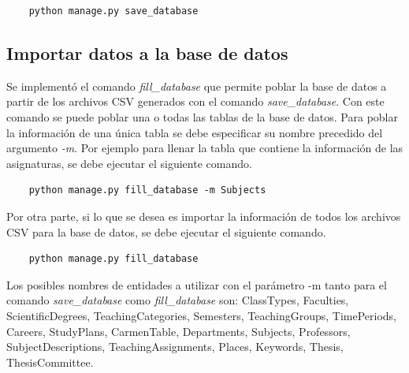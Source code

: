 \begin{verbatim}
    python manage.py save_database
\end{verbatim}


\subsection{Importar datos a la base de datos}
Se implementó el comando \textit{fill\_database} que permite poblar la 
base de datos a partir de los archivos CSV generados con el comando \textit{save\_database}.
Con este comando se puede poblar una o todas las tablas de la base de 
datos. 
Para poblar la información de una única tabla
se debe especificar su nombre precedido del argumento \textit{-m}. Por 
ejemplo para llenar la tabla que contiene la información de las asignaturas, se debe 
ejecutar el siguiente comando.

\begin{verbatim}
    python manage.py fill_database -m Subjects
\end{verbatim}

Por otra parte, si lo que se desea es importar la información de todos los archivos CSV  
para la base de datos, se debe ejecutar el siguiente comando.

\begin{verbatim}
    python manage.py fill_database
\end{verbatim}


Los posibles nombres de entidades a utilizar con
el parámetro -m tanto para el comando 
\textit{save\_database} como \textit{fill\_database} son:
ClassTypes, Faculties,
ScientificDegrees, TeachingCategories,
Semesters, TeachingGroups, TimePeriods,
Careers, StudyPlans, CarmenTable, Departments,
Subjects, Professors, SubjectDescriptions, TeachingAssignments,
Places, Keywords, Thesis, ThesisCommittee.




